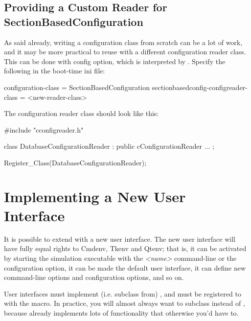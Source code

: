 \subsection{Providing a Custom Reader for SectionBasedConfiguration}
\label{sec:plugin-exts:custom-reader-for-sectionbasedconfiguration}

As said already, writing a configuration class from scratch can
be a lot of work, and it may be more practical to reuse
 with a different configuration
reader class. This can be done with 
config option, which is interpreted by .
Specify the following in the boot-time ini file:

\begin{inifile}
[General]
configuration-class = SectionBasedConfiguration
sectionbasedconfig-configreader-class = <new-reader-class>
\end{inifile}

The configuration reader class should look like this:

\begin{cpp}
#include "cconfigreader.h"

class DatabaseConfigurationReader : public cConfigurationReader
{
   ...
};

Register_Class(DatabaseConfigurationReader);
\end{cpp}


\section{Implementing a New User Interface}
\label{sec:plugin-exts:user-interface}

It is possible to extend {\opp} with a new user interface. The new
user interface will have fully equal rights to Cmdenv, Tkenv and Qtenv;
that is, it can be activated by starting the simulation executable with the
 \textit{<name>} command-line or the 
configuration option, it can be made the default user interface,
it can define new command-line options and configuration options,
and so on.

User interfaces must implement (i.e. subclass from) ,
and must be registered to {\opp} with the  macro.
In practice, you will almost always want to subclass 
instead of , because  already
implements lots of functionality that otherwise you'd have to.

